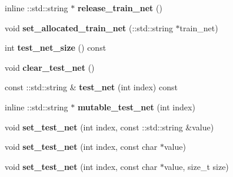 \begin{DoxyCompactItemize}
\item 
\mbox{\label{classcaffe_1_1_solver_parameter_ad90cb983cf4f608f090b6d1166e11f24}} 
inline \+::std\+::string $\ast$ {\bfseries release\+\_\+train\+\_\+net} ()
\item 
\mbox{\label{classcaffe_1_1_solver_parameter_aab702123374ec943e5ea07c7afffb317}} 
void {\bfseries set\+\_\+allocated\+\_\+train\+\_\+net} (\+::std\+::string $\ast$train\+\_\+net)
\item 
\mbox{\label{classcaffe_1_1_solver_parameter_a0e58511440aec5b432ee82b2ca88e25a}} 
int {\bfseries test\+\_\+net\+\_\+size} () const
\item 
\mbox{\label{classcaffe_1_1_solver_parameter_a41be218caf016dc1f55a87d812c247f1}} 
void {\bfseries clear\+\_\+test\+\_\+net} ()
\item 
\mbox{\label{classcaffe_1_1_solver_parameter_a63522e7fe01f59ba9148448f8f899765}} 
const \+::std\+::string \& {\bfseries test\+\_\+net} (int index) const
\item 
\mbox{\label{classcaffe_1_1_solver_parameter_a375aa1678aea25601bd65ccc6afbb60a}} 
inline \+::std\+::string $\ast$ {\bfseries mutable\+\_\+test\+\_\+net} (int index)
\item 
\mbox{\label{classcaffe_1_1_solver_parameter_a1aa3590587a33bb0bbb99a1151f00b8d}} 
void {\bfseries set\+\_\+test\+\_\+net} (int index, const \+::std\+::string \&value)
\item 
\mbox{\label{classcaffe_1_1_solver_parameter_ae20bd4518717ddcc1988f3f020f6f283}} 
void {\bfseries set\+\_\+test\+\_\+net} (int index, const char $\ast$value)
\item 
\mbox{\label{classcaffe_1_1_solver_parameter_afdad8c47f93cce0a6a825707e05b937c}} 
void {\bfseries set\+\_\+test\+\_\+net} (int index, const char $\ast$value, size\+\_\+t size)
\item 
\mbox{\label{classcaffe_1_1_solver_parameter_a2f804f7125317c37025ee33c107d4ffa}} 

\end{DoxyCompactItemize}
